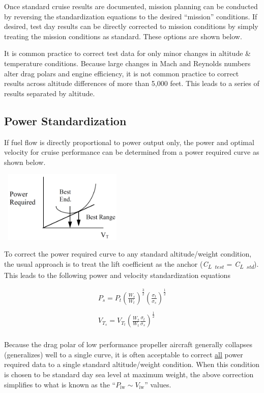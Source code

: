 \documentclass[
]{book}
\begin{document}
Once standard cruise results are documented, mission planning can be conducted
by reversing the standardization equations to the desired ``mission'' conditions.
If desired, test day results can be directly corrected to mission conditions by
simply treating the mission conditions as standard. These options are shown
below.

It is common practice to correct test data for only minor changes in altitude \&
temperature conditions. Because large changes in Mach and Reynolds numbers alter
drag polars and engine efficiency, it is not common practice to correct results
across altitude differences of more than 5,000 feet. This leads to a series of
results separated by altitude.

\hypertarget{power-standardization}{%
\subsection{Power Standardization}\label{power-standardization}}

If fuel flow is directly proportional to power output only, the power and
optimal velocity for cruise performance can be determined from a power required
curve as shown below.

\includegraphics[width=2.38542in,height=1.33542in]{media/12/power-speed-curve.png}

To correct the power required curve to any standard altitude/weight condition, the usual approach is to treat the lift coefficient as the anchor (\emph{C\textsubscript{L~test~}}= \emph{C\textsubscript{L~std}}). This leads to the following power and velocity standardization equations

\begin{align}
P_s = P_t \left( \frac{W_s}{W_t} \right)^{\frac{3}{2}} \left( \frac{\sigma_t}{\sigma_s} \right)^{\frac{1}{2}} \\
\\
V_{T_s} = V_{T_t} \left( \frac{W_s}{W_t} \frac{\sigma_t}{\sigma_s} \right)^{\frac{1}{2}}\\
\label{eq:pwr-vel-std}
\end{align}

Because the drag polar of low performance propeller aircraft generally collapses
(generalizes) well to a single curve, it is often acceptable to correct
\underline{all} power required data to a single standard altitude/weight
condition. When this condition is chosen to be standard day sea level at maximum
weight, the above correction simplifies to what is known as the
``\(P_{\text{iw}} \sim V_{\text{iw}}\)'' values.
\end{document}
